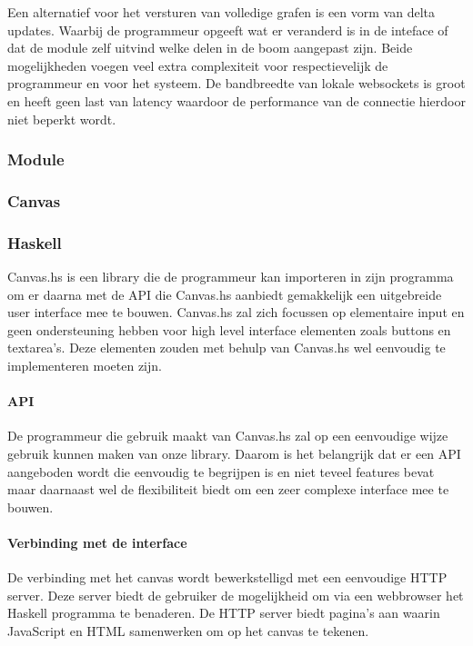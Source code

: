 Een alternatief voor het versturen van volledige grafen is een vorm van delta updates. Waarbij de programmeur opgeeft wat er veranderd is in de inteface of dat de module zelf uitvind welke delen in de boom aangepast zijn. Beide mogelijkheden voegen veel extra complexiteit voor respectievelijk de programmeur en voor het systeem. De bandbreedte van lokale websockets is groot en heeft geen last van latency waardoor de performance van de connectie hierdoor niet beperkt wordt.

\subsubsection{Module}


\subsubsection{Canvas}



\subsubsection{Haskell}
Canvas.hs is een library die de programmeur kan importeren in zijn programma om er daarna met de API die Canvas.hs aanbiedt gemakkelijk een uitgebreide user interface mee te bouwen. Canvas.hs zal zich focussen op elementaire input en geen ondersteuning hebben voor high level interface elementen zoals buttons en textarea's. Deze elementen zouden met behulp van Canvas.hs wel eenvoudig te implementeren moeten zijn.

\paragraph{API}
De programmeur die gebruik maakt van Canvas.hs zal op een eenvoudige wijze gebruik kunnen maken van onze library. Daarom is het belangrijk dat er een API aangeboden wordt die eenvoudig te begrijpen is en niet teveel features bevat maar daarnaast wel de flexibiliteit biedt om een zeer complexe interface mee te bouwen.

\paragraph{Verbinding met de interface}
De verbinding met het canvas wordt bewerkstelligd met een eenvoudige HTTP server. Deze server biedt de gebruiker de mogelijkheid om via een webbrowser het Haskell programma te benaderen. De HTTP server biedt pagina's aan waarin JavaScript en HTML samenwerken om op het canvas te tekenen.

